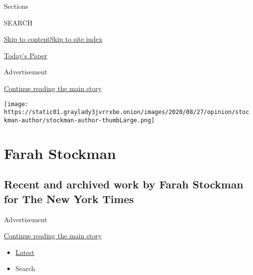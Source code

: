 Sections

SEARCH

\protect\hyperlink{site-content}{Skip to
content}\protect\hyperlink{site-index}{Skip to site index}

\href{https://myaccount.nytimes3xbfgragh.onion/auth/login?response_type=cookie\&client_id=vi}{}

\href{https://www.nytimes3xbfgragh.onion/section/todayspaper}{Today's
Paper}

Advertisement

\protect\hyperlink{after-top}{Continue reading the main story}

\texttt{[image: https://static01.graylady3jvrrxbe.onion/images/2020/08/27/opinion/stockman-author/stockman-author-thumbLarge.png]}

\hypertarget{farah-stockman}{%
\section{Farah Stockman}\label{farah-stockman}}

\hypertarget{recent-and-archived-work-by-farah-stockman-for-the-new-york-times}{%
\subsection{Recent and archived work by Farah Stockman for The New York
Times}\label{recent-and-archived-work-by-farah-stockman-for-the-new-york-times}}

Advertisement

\protect\hyperlink{after-mid1}{Continue reading the main story}

\begin{itemize}
\tightlist
\item
  \protect\hyperlink{stream-panel}{Latest}
\item
  Search
\end{itemize}

